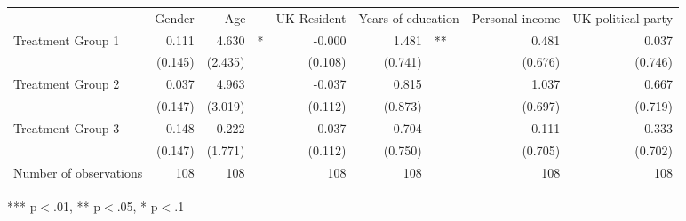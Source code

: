 \documentclass{article}
\begin{document}
\begin{table}[!h]
\centering
\begin{tabular}{lllllllll}
\cline{1-9}
\multicolumn{1}{r}{} &
  \multicolumn{1}{c}{Gender} &
  \multicolumn{2}{c}{Age} &
  \multicolumn{1}{c}{UK Resident} &
  \multicolumn{2}{c}{Years of education} &
  \multicolumn{1}{c}{Personal income} &
  \multicolumn{1}{c}{UK political party} \\
\cline{1-9}
\multicolumn{1}{l}{Treatment Group 1} &
  \multicolumn{1}{r}{0.111} &
  \multicolumn{1}{r}{4.630} &
  \multicolumn{1}{l}{*} &
  \multicolumn{1}{r}{-0.000} &
  \multicolumn{1}{r}{1.481} &
  \multicolumn{1}{l}{**} &
  \multicolumn{1}{r}{0.481} &
  \multicolumn{1}{r}{0.037} \\
\multicolumn{1}{l}{} &
  \multicolumn{1}{r}{(0.145)} &
  \multicolumn{1}{r}{(2.435)} &
  \multicolumn{1}{l}{} &
  \multicolumn{1}{r}{(0.108)} &
  \multicolumn{1}{r}{(0.741)} &
  \multicolumn{1}{l}{} &
  \multicolumn{1}{r}{(0.676)} &
  \multicolumn{1}{r}{(0.746)} \\
\multicolumn{1}{l}{Treatment Group 2} &
  \multicolumn{1}{r}{0.037} &
  \multicolumn{1}{r}{4.963} &
  \multicolumn{1}{l}{} &
  \multicolumn{1}{r}{-0.037} &
  \multicolumn{1}{r}{0.815} &
  \multicolumn{1}{l}{} &
  \multicolumn{1}{r}{1.037} &
  \multicolumn{1}{r}{0.667} \\
\multicolumn{1}{l}{} &
  \multicolumn{1}{r}{(0.147)} &
  \multicolumn{1}{r}{(3.019)} &
  \multicolumn{1}{l}{} &
  \multicolumn{1}{r}{(0.112)} &
  \multicolumn{1}{r}{(0.873)} &
  \multicolumn{1}{l}{} &
  \multicolumn{1}{r}{(0.697)} &
  \multicolumn{1}{r}{(0.719)} \\
\multicolumn{1}{l}{Treatment Group 3} &
  \multicolumn{1}{r}{-0.148} &
  \multicolumn{1}{r}{0.222} &
  \multicolumn{1}{l}{} &
  \multicolumn{1}{r}{-0.037} &
  \multicolumn{1}{r}{0.704} &
  \multicolumn{1}{l}{} &
  \multicolumn{1}{r}{0.111} &
  \multicolumn{1}{r}{0.333} \\
\multicolumn{1}{l}{} &
  \multicolumn{1}{r}{(0.147)} &
  \multicolumn{1}{r}{(1.771)} &
  \multicolumn{1}{l}{} &
  \multicolumn{1}{r}{(0.112)} &
  \multicolumn{1}{r}{(0.750)} &
  \multicolumn{1}{l}{} &
  \multicolumn{1}{r}{(0.705)} &
  \multicolumn{1}{r}{(0.702)} \\
\multicolumn{1}{l}{Number of observations} &
  \multicolumn{1}{r}{108} &
  \multicolumn{1}{r}{108} &
  \multicolumn{1}{l}{} &
  \multicolumn{1}{r}{108} &
  \multicolumn{1}{r}{108} &
  \multicolumn{1}{l}{} &
  \multicolumn{1}{r}{108} &
  \multicolumn{1}{r}{108} \\
\cline{1-9}
\end{tabular}

\footnotesize{
*** p$<$.01, ** p$<$.05, * p$<$.1
}
\end{table}
\end{document}

